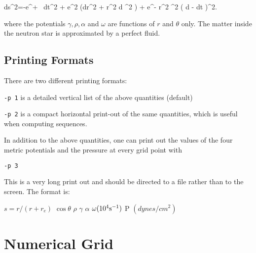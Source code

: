 \bee ds^2=-e^{\gamma+ \rho} \ dt^2 + e^{2 \alpha} \bigl(dr^2 + r^2 d \theta^2 
          \bigr) + e^{\gamma - \rho} r^2 \sin^2 \theta \bigl( d \phi - \omega dt
          \bigr)^2. \ee

\<where the potentials $\gamma, \rho, \alpha$ and $\omega$ are functions of 
$r$ and 
$\theta$ only. The matter inside the neutron star is approximated by a perfect 
fluid.
 
\subsection{Printing Formats}

There are two different printing formats:

\begin{description}

\item{{\tt -p 1} is a detailed vertical list of the above quantities (default)}
\item{{\tt -p 2} is a compact horizontal print-out of the same quantities,
                 which is useful when computing sequences}.
\end{description}

\<In addition to the above quantities, one can print out the values of the
four metric potentials and the pressure at every grid point with

\vspace{0.2cm}
  
{\tt -p 3}

\vspace{0.2cm}

\<This is a very long print out and should be directed to a file rather than to
the screen. The format is:

\vspace{0.2cm}

 $s=r/(r+r_e)$ \hspace{0.6cm} $\cos \theta$ \hspace{0.6cm} $\rho$ \hspace{0.6cm} 
$\gamma$ \hspace{0.6cm} $\alpha$ \hspace{0.6cm} $\omega (10^4 {\rm s^{-1}})$ 
\hspace{0.6cm}  P $(dynes/cm^2)$

\section{Numerical Grid}

